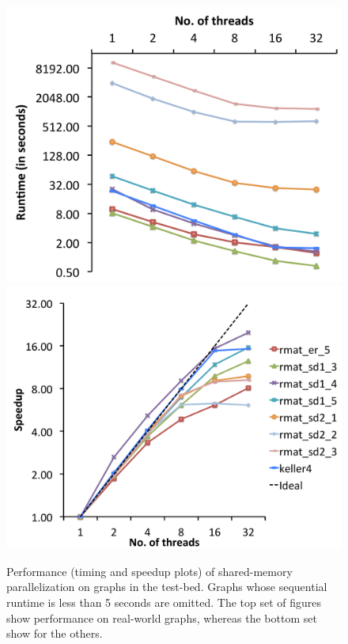 \begin{figure}
    \includegraphics[scale=0.17]{parallel_other_timing.pdf}
    \includegraphics[scale=0.17]{parallel_other_speedup.pdf}
    
 \caption{Performance (timing and speedup plots) of shared-memory parallelization on graphs in the test-bed. Graphs whose sequential runtime is less than 5 seconds are omitted. The top set of figures show performance on real-world graphs, whereas the bottom set show for the others.}
\label{fig-parallel_perf}
\end{figure}


